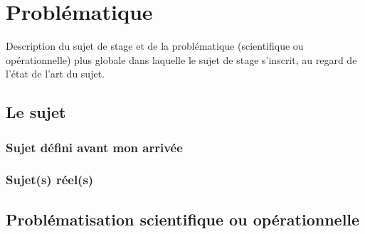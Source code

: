 \chapter{Problématique}
\label{sec:prob}

Description du sujet de stage et de la problématique (scientifique ou opérationnelle) plus globale dans laquelle le sujet de stage s’inscrit, au regard de l'état de l'art du sujet.

\section{Le sujet}
	\subsection{Sujet défini avant mon arrivée}
		\lipsum[1-2]

	\subsection{Sujet(s) réel(s)}
		\lipsum[1-2]

\section{Problématisation scientifique ou opérationnelle}
	\lipsum[1-2]
